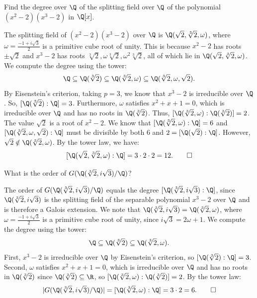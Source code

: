 \begin{problem}[44.6]
  Find the degree over $\Q$ of the splitting field over $\Q$ of the polynomial $(x^2 - 2)(x^3 - 2)$ in $\Q[x]$.
\end{problem}

\begin{solution}
  The splitting field of $(x^2 - 2)(x^3 - 2)$ over $\Q$ is $\Q(\sqrt{2}, \sqrt[3]{2}, \omega)$, where $\omega = \frac{-1 + i\sqrt{3}}{2}$ is a primitive cube root of unity. This is because $x^2 - 2$ has roots $\pm\sqrt{2}$ and $x^3 - 2$ has roots $\sqrt[3]{2}, \omega\sqrt[3]{2}, \omega^2\sqrt[3]{2}$, all of which lie in $\Q(\sqrt{2}, \sqrt[3]{2}, \omega)$. We compute the degree using the tower:
  \[%
    \Q \subseteq \Q(\sqrt[3]{2}) \subseteq \Q(\sqrt[3]{2}, \omega) \subseteq \Q(\sqrt[3]{2}, \omega, \sqrt{2})
  .\]%
  By Eisenstein's criterion, taking $p = 3$, we know that $x^3 - 2$ is irreducible over $\Q$. So, $[\Q(\sqrt[3]{2}) : \Q] = 3$. Furthermore, $\omega$ satisfies $x^2 + x + 1 = 0$, which is irreducible over $\Q$ and has no roots in $\Q(\sqrt[3]{2})$. Thus, $[\Q(\sqrt[3]{2}, \omega) : \Q(\sqrt[3]{2})] = 2$. The value $\sqrt{2}$ is a root of $x^2 - 2$. We know that $[\Q(\sqrt[3]{2}, \omega) : \Q] = 6$ and $[\Q(\sqrt[3]{2}, \omega, \sqrt{2}) : \Q]$ must be divisible by both $6$ and $2 = [\Q(\sqrt{2}) : \Q]$. However, $\sqrt{2} \notin \Q(\sqrt[3]{2}, \omega)$. By the tower law, we have:
  \[%
    [\Q(\sqrt{2}, \sqrt[3]{2}, \omega) : \Q] = 3 \cdot 2 \cdot 2 = 12
  .\qedhere\]%
\end{solution}

\begin{problem}[44.8]
  What is the order of $G(\Q(\sqrt[3]{2}, i\sqrt{3})/\Q)$?
\end{problem}

\begin{solution}
  The order of $G(\Q(\sqrt[3]{2}, i\sqrt{3})/\Q)$ equals the degree $[\Q(\sqrt[3]{2}, i\sqrt{3}) : \Q]$, since $\Q(\sqrt[3]{2}, i\sqrt{3})$ is the splitting field of the separable polynomial $x^3 - 2$ over $\Q$ and is therefore a Galois extension. We note that $\Q(\sqrt[3]{2}, i\sqrt{3}) = \Q(\sqrt[3]{2}, \omega)$, where $\omega = \frac{-1 + i\sqrt{3}}{2}$ is a primitive cube root of unity, since $i\sqrt{3} = 2\omega + 1$. We compute the degree using the tower:
  \[%
    \Q \subseteq \Q(\sqrt[3]{2}) \subseteq \Q(\sqrt[3]{2}, \omega)
  .\]%
  First, $x^3 - 2$ is irreducible over $\Q$ by Eisenstein's criterion, so $[\Q(\sqrt[3]{2}) : \Q] = 3$. Second, $\omega$ satisfies $x^2 + x + 1 = 0$, which is irreducible over $\Q$ and has no roots in $\Q(\sqrt[3]{2})$ since $\Q(\sqrt[3]{2}) \subseteq \R$, so $[\Q(\sqrt[3]{2}, \omega) : \Q(\sqrt[3]{2})] = 2$. By the tower law:
  \[%
    |G(\Q(\sqrt[3]{2}, i\sqrt{3})/\Q)| = [\Q(\sqrt[3]{2}, \omega) : \Q] = 3 \cdot 2 = 6
  .\qedhere\]%
\end{solution}

